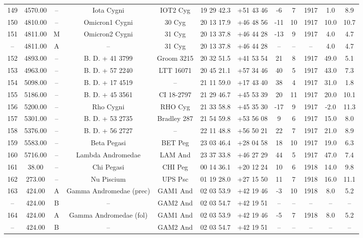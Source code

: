 \begin{table}
\begin{tabular}{cccccccccccc}
149 & 4570.00 & -- & Iota Cygni & IOT2 Cyg & 19 29 42.3 & +51 43 46 & -6 & 7 & 1917 & 1.0 & 8.9 \\
150 & 4810.00 & -- & Omicron1 Cygni & 30 Cyg & 20 13 17.9 & +46 48 56 & -11 & 10 & 1917 & 10.0 & 10.7 \\
151 & 4811.00 & M & Omicron2 Cygni & 31 Cyg & 20 13 37.8 & +46 44 28 & -13 & 9 & 1917 & 4.0 & 4.7 \\
-- & 4811.00 & A & -- & 31 Cyg & 20 13 37.8 & +46 44 28 & -- & -- & -- & 4.0 & 4.7 \\
152 & 4893.00 & -- & B. D. + 41  3799 & Groom 3215 & 20 32 51.5 & +41 53 54 & 21 & 8 & 1917 & 49.0 & 5.1 \\
153 & 4963.00 & -- & B. D. + 57  2240 & LTT 16071 & 20 45 21.1 & +57 34 46 & 40 & 5 & 1917 & 43.0 & 7.3 \\
154 & 5098.00 & -- & B. D. + 17  4519 & -- & 21 11 59.0 & +17 43 40 & 38 & 4 & 1917 & 31.0 & 1.8 \\
155 & 5186.00 & -- & B. D. + 45  3561 & CI 18-2797 & 21 29 46.7 & +45 53 39 & 20 & 11 & 1917 & 20.0 & 10.1 \\
156 & 5200.00 & -- & Rho Cygni & RHO Cyg & 21 33 58.8 & +45 35 30 & -17 & 9 & 1917 & -2.0 & 11.3 \\
157 & 5301.00 & -- & B. D. + 53  2735 & Bradley 287 & 21 54 59.8 & +53 56 08 & 9 & 6 & 1917 & 15.0 & 8.0 \\
158 & 5376.00 & -- & B. D. + 56  2727 & -- & 22 11 48.8 & +56 50 21 & 22 & 7 & 1917 & 21.0 & 8.9 \\
159 & 5583.00 & -- & Beta Pegasi & BET Peg & 23 03 46.4 & +28 04 58 & 18 & 10 & 1917 & 19.0 & 6.3 \\
160 & 5716.00 & -- & Lambda Andromedae & LAM And & 23 37 33.8 & +46 27 29 & 44 & 5 & 1917 & 47.0 & 7.4 \\
161 & 38.00 & -- & Chi Pegasi & CHI Peg & 00 14 36.1 & +20 12 24 & 10 & 6 & 1918 & 14.0 & 9.8 \\
162 & 273.00 & -- & Nu Piscium & UPS Psc & 01 19 28.0 & +27 15 50 & 11 & 7 & 1918 & 16.0 & 11.1 \\
163 & 424.00 & A & Gamma Andromedae (prec) & GAM1 And & 02 03 53.9 & +42 19 46 & -3 & 10 & 1918 & 8.0 & 5.2 \\
-- & 424.00 & B & -- & GAM2 And & 02 03 54.7 & +42 19 51 & -- & -- & -- & -- & -- \\
164 & 424.00 & A & Gamma Andromedae (fol) & GAM1 And & 02 03 53.9 & +42 19 46 & -5 & 7 & 1918 & 8.0 & 5.2 \\
-- & 424.00 & B & -- & GAM2 And & 02 03 54.7 & +42 19 51 & -- & -- & -- & -- & -- \\

\end{tabular}
\end{table}
